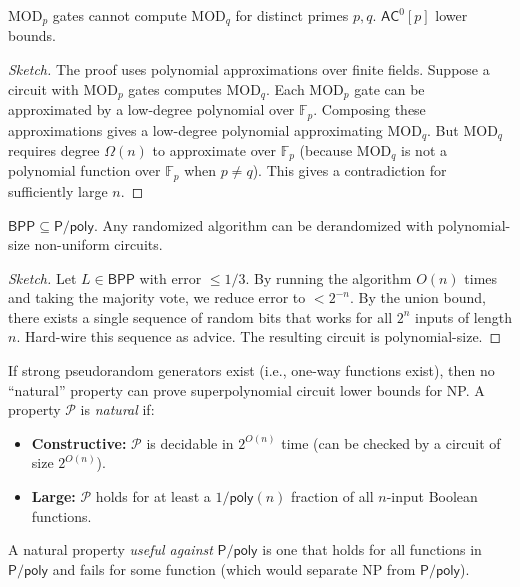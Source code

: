 \begin{theorem}
MOD$_p$ gates cannot compute MOD$_q$ for distinct primes $p, q$. $\mathsf{AC}^0[p]$ lower bounds.
\end{theorem}

\begin{proof}[Sketch]
The proof uses polynomial approximations over finite fields. Suppose a circuit with MOD$_p$ gates computes MOD$_q$. Each MOD$_p$ gate can be approximated by a low-degree polynomial over $\mathbb{F}_p$. Composing these approximations gives a low-degree polynomial approximating MOD$_q$. But MOD$_q$ requires degree $\Omega(n)$ to approximate over $\mathbb{F}_p$ (because MOD$_q$ is not a polynomial function over $\mathbb{F}_p$ when $p \neq q$). This gives a contradiction for sufficiently large $n$.
\end{proof}

\begin{theorem}[Adleman 1978]
$\mathsf{BPP} \subseteq \mathsf{P}/\mathsf{poly}$. Any randomized algorithm can be derandomized with polynomial-size non-uniform circuits.
\end{theorem}

\begin{proof}[Sketch]
Let $L \in \mathsf{BPP}$ with error $\le 1/3$. By running the algorithm $O(n)$ times and taking the majority vote, we reduce error to $< 2^{-n}$. By the union bound, there exists a single sequence of random bits that works for all $2^n$ inputs of length $n$. Hard-wire this sequence as advice. The resulting circuit is polynomial-size.
\end{proof}

\begin{theorem}
If strong pseudorandom generators exist (i.e., one-way functions exist), then no ``natural'' property can prove superpolynomial circuit lower bounds for NP. A property $\mathcal{P}$ is \emph{natural} if:
\begin{itemize}
\item \textbf{Constructive:} $\mathcal{P}$ is decidable in $2^{O(n)}$ time (can be checked by a circuit of size $2^{O(n)}$).
\item \textbf{Large:} $\mathcal{P}$ holds for at least a $1/\mathsf{poly}(n)$ fraction of all $n$-input Boolean functions.
\end{itemize}
A natural property \emph{useful against} $\mathsf{P}/\mathsf{poly}$ is one that holds for all functions in $\mathsf{P}/\mathsf{poly}$ and fails for some function (which would separate NP from $\mathsf{P}/\mathsf{poly}$).
\end{theorem}

